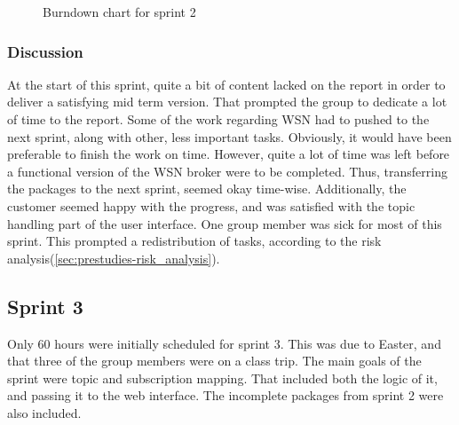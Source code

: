 \begin{center}
  \begin{figure}[ht!]
    \caption{Burndown chart for sprint 2}
    \label{fig:sprint 2, burndown}
  \end{figure}
\end{center}

\subsubsection{Discussion}
\label{subsec:project_lifecycle-development-sprint_2-discussion}

At the start of this sprint, quite a bit of content lacked on the report in order to deliver a satisfying mid term version. That prompted the group to dedicate a lot of time to the report. Some of the work regarding WSN had to pushed to the next sprint, along with other, less important tasks. Obviously, it would have been preferable to finish the work on time. However, quite a lot of time was left before a functional version of the WSN broker were to be completed. Thus, transferring the packages to the next sprint, seemed okay time-wise. Additionally, the customer seemed happy with the progress, and was satisfied with the topic handling part of the user interface. One group member was sick for most of this sprint. This prompted a redistribution of tasks, according to the risk analysis(\ref{sec:prestudies-risk_analysis}).

\subsection{Sprint 3}
\label{subsec:project_lifecycle-development-sprint_3}

Only 60 hours were initially scheduled for sprint 3. This was due to Easter, and that three of the group members were on a class trip. The main goals of the sprint were topic and subscription mapping. That included both the logic of it, and passing it to the web interface. The incomplete packages from sprint 2 were also included.

